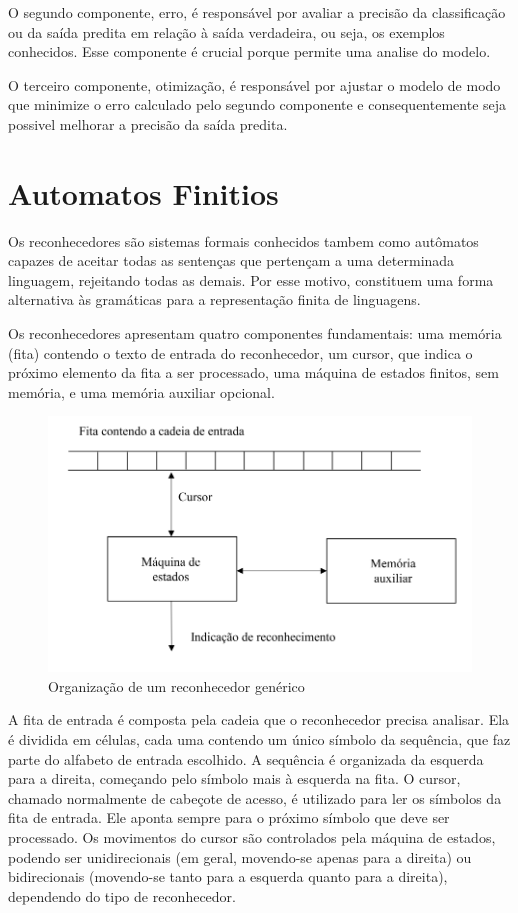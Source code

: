 O segundo componente, erro, é responsável por avaliar a precisão da classificação ou da saída predita em relação à saída verdadeira, ou seja, os exemplos conhecidos. Esse componente é crucial porque permite uma analise do modelo.


O terceiro componente, otimização, é responsável por ajustar o modelo de modo que  minimize o  erro calculado pelo segundo componente e consequentemente seja possivel melhorar a precisão da saída predita. 



\section[Automatos Finitos]{Automatos Finitios}


Os reconhecedores são sistemas formais conhecidos tambem como autômatos capazes de aceitar todas as sentenças que pertençam a uma determinada linguagem, rejeitando todas as demais. Por esse motivo, constituem uma forma alternativa às gramáticas para a representação finita de linguagens.\cite{reconhecimento}

Os reconhecedores apresentam quatro componentes fundamentais: uma memória (fita) contendo o texto de entrada do
reconhecedor, um cursor, que indica o próximo elemento da fita a ser processado, uma máquina de estados finitos, sem memória, e uma memória auxiliar opcional.


\begin{figure}[!htb]
	\centering
	\includegraphics[scale=2]{figuras/AFD/reconhecedor.png}
	\caption{Organização de um reconhecedor genérico}
	\label{fig:Organizacao de um reconhecedor generico}
\end{figure}


A fita de entrada é composta pela cadeia que o reconhecedor precisa analisar. Ela é dividida em células, cada uma contendo um único símbolo da sequência, que faz parte do alfabeto de entrada escolhido. A sequência é organizada da esquerda para a direita, começando pelo símbolo mais à esquerda na fita. O cursor, chamado normalmente de cabeçote de acesso, é utilizado para ler os símbolos da fita de entrada. Ele aponta sempre para o próximo símbolo que deve ser processado. Os movimentos do cursor são controlados pela máquina de estados, podendo ser unidirecionais (em geral, movendo-se apenas para a direita) ou bidirecionais (movendo-se tanto para a esquerda quanto para a direita), dependendo do tipo de reconhecedor\cite{reconhecimento}.

